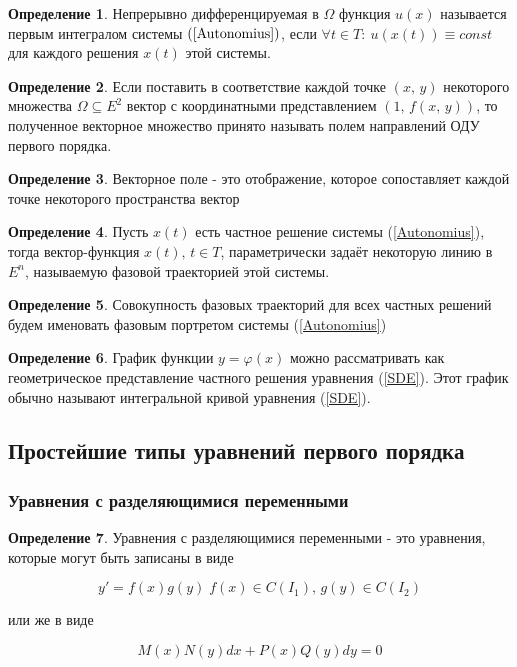 \documentclass[a4paper,12pt]{article}
\renewcommand{\phi}{\ensuremath{\varphi}}
\theoremstyle{plain}
\theoremstyle{definition}
\newtheorem{definition}{Определение}[section]
\theoremstyle{remark}
\begin{document}
\begin{definition}
	Непрерывно дифференцируемая в $\Omega$ функция $u(x)$ называется первым интегралом системы $(\ref*{Autonomius})$, если $\forall t \in T:\: u(x(t)) \equiv const$ для каждого решения $x(t)$ этой системы.
\end{definition}

\begin{definition}
	Если поставить в соответствие каждой точке $(x,\, y)$ некоторого множества $\Omega \subseteq E^2$ вектор с координатными представлением $(1,\, f(x,\,y))$, то полученное векторное множество принято называть полем направлений ОДУ первого порядка.
\end{definition}

\begin{definition}
	Векторное поле - это отображение, которое сопоставляет каждой точке некоторого пространства вектор
\end{definition}

\begin{definition}
	Пусть $x(t)$ есть частное решение системы (\ref*{Autonomius}), тогда вектор-функция $x(t),\, t \in T$, параметрически задаёт некоторую линию в $E^n$, называемую фазовой траекторией этой системы.
\end{definition}

\begin{definition}
	Совокупность фазовых траекторий для всех частных решений будем именовать фазовым портретом системы (\ref*{Autonomius})
\end{definition}

\begin{definition}
	График функции $y = \phi(x)$ можно рассматривать как геометрическое представление частного решения уравнения (\ref*{SDE}). Этот график обычно называют интегральной кривой уравнения (\ref*{SDE}).
\end{definition}

\subsection{Простейшие типы уравнений первого порядка}

\subsubsection*{Уравнения с разделяющимися переменными}
\begin{definition}
	Уравнения с разделяющимися переменными - это уравнения, которые могут быть записаны в виде

	\[y' = f(x)g(y)\; f(x) \in C(I_1),\, g(y) \in C(I_2)\]

	или же в виде

	\[M(x)N(y)dx + P(x)Q(y)dy = 0\]
\end{definition}
\end{document}
